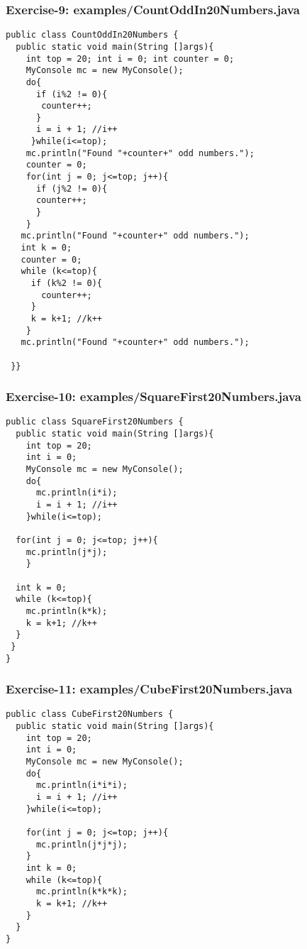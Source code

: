 \documentclass[xcolor=dvipsnames,dvip,notes=show,table]{beamer}
\begin{document}
\begin{frame}[fragile]
\frametitle{Exercise-9: examples/CountOddIn20Numbers.java}
\tiny
\begin{lstlisting}
public class CountOddIn20Numbers {
  public static void main(String []args){
    int top = 20; int i = 0; int counter = 0;
    MyConsole mc = new MyConsole();
    do{
      if (i%2 != 0){
       counter++;
      }
      i = i + 1; //i++
     }while(i<=top);				
    mc.println("Found "+counter+" odd numbers.");
    counter = 0;
    for(int j = 0; j<=top; j++){
      if (j%2 != 0){
      counter++;
      }
    }
   mc.println("Found "+counter+" odd numbers.");
   int k = 0;
   counter = 0;
   while (k<=top){
     if (k%2 != 0){
       counter++;
     }
     k = k+1; //k++
    }
   mc.println("Found "+counter+" odd numbers.");

 }}
\end{lstlisting}
\end{frame}






\begin{frame}[fragile]
\frametitle{Exercise-10: examples/SquareFirst20Numbers.java}
\tiny
\begin{lstlisting}
public class SquareFirst20Numbers {
  public static void main(String []args){
    int top = 20;
    int i = 0;
    MyConsole mc = new MyConsole();
    do{
      mc.println(i*i);
      i = i + 1; //i++
    }while(i<=top);
  
  for(int j = 0; j<=top; j++){
    mc.println(j*j);
    }

  int k = 0;
  while (k<=top){
    mc.println(k*k);
    k = k+1; //k++
  }
 }
}
\end{lstlisting}
\end{frame}




\begin{frame}[fragile]
\frametitle{Exercise-11: examples/CubeFirst20Numbers.java}
\tiny
\begin{lstlisting}
public class CubeFirst20Numbers {
  public static void main(String []args){
    int top = 20;
    int i = 0;
    MyConsole mc = new MyConsole();
    do{
      mc.println(i*i*i);
      i = i + 1; //i++
    }while(i<=top);

    for(int j = 0; j<=top; j++){
      mc.println(j*j*j);
    }
    int k = 0;
    while (k<=top){
      mc.println(k*k*k);
      k = k+1; //k++
    }
  }
}
\end{lstlisting}
\end{frame}
\end{document}
